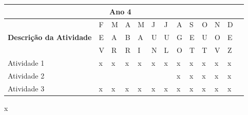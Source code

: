 \documentclass[
  12pt,				
  openright,	
  twoside,	
  a4paper,
  brazil,	
  oldfontcommands,
  ]{abntex2}
\begin{document}
\begin{table}[H]
\begin{center}
\begin{tabularx}{\textwidth}{|p{10cm}|X|X|X|X|X|X|X|X|X|X|X|X|}
\hline
\multicolumn{12}{|c|}{\cellcolor{green} \textbf{Ano 4}} \\\hline
\multirow{3}{*}{\textbf{Descri\c{c}\~{a}o da Atividade}} 
                                                         	& F & M & A & M & J & J & A & S & O & N & D \\
                                                         	& E & A & B & A & U & U & G & E & U & O & E \\
                                                         	& V & R & R & I & N & L & O & T & T & V & Z \\\hline
Atividade 1                                     	& x  & x  & x  & x  & x  & x  & x  & x  & x  & x  & x  \\\hline
Atividade 2					&   &   &   &   &   &   & x  & x & x  & x  & x  \\\hline
Atividade 3	                                  & x  & x  & x  & x  & x  &  x &  x & x  &  x & x  &  x \\\hline
\end{tabularx}
\end{center}
\end{table}
\vspace{-10mm}
\vfill
{\color{white}x}
\end{document}
